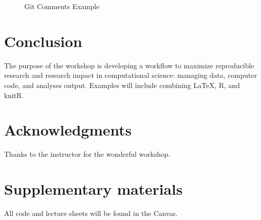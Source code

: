 \documentclass[12pt]{article}
\begin{document}
\begin{figure}[H]
\begin{minipage}[b]{0.5\textwidth}
            \caption{Git Comments Example}
            \label{fig:gitcomments}
      \end{minipage}
\end{figure}

\section{Conclusion}
The purpose of the workshop is developing a workflow to maximize reproducible research and research impact in computational science: managing data, computer code, and analyses output. Examples will include combining LaTeX, R, and knitR\cite{citeKnitr}.







\section*{Acknowledgments}
Thanks to the instructor for the wonderful workshop.

\section*{Supplementary materials}
All code and lecture sheets will be found in the Canvas.


\end{document}
